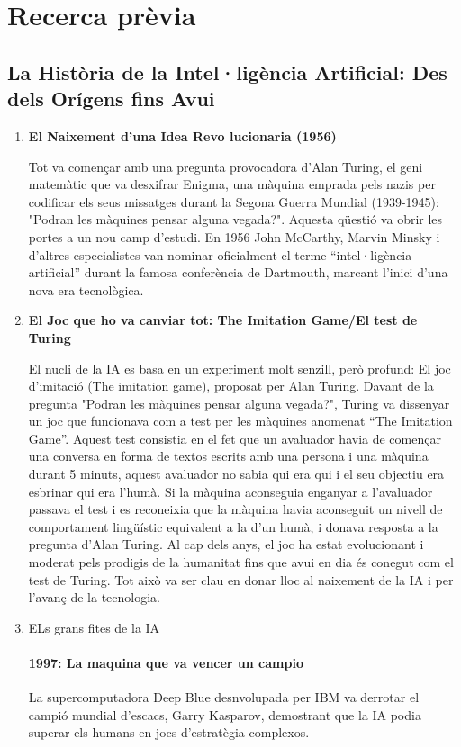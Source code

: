  \chapter{Recerca prèvia}
\label{c:recerca prèvia}
\section{La Història de la Intel·ligència Artificial: Des dels Orígens fins Avui}
\begin{enumerate}
     \item \textbf{El Naixement d'una Idea Revo lucionaria (1956)}

             Tot va començar amb una pregunta provocadora d’Alan Turing, el geni matemàtic que va desxifrar Enigma, una màquina emprada pels nazis per codificar els seus missatges durant la Segona Guerra Mundial (1939-1945): "Podran les màquines pensar alguna vegada?". Aquesta qüestió va obrir les portes a un nou camp d’estudi. En 1956 John McCarthy, Marvin Minsky i d'altres especialistes van nominar oficialment el terme ``intel·ligència artificial'' durant la famosa conferència de Dartmouth, marcant l'inici d'una nova era tecnològica.

      \item \textbf{El Joc que ho va canviar tot: The Imitation Game/El test de Turing}

            El nucli de la IA es basa en un experiment molt senzill, però profund: El joc d'imitació (The imitation game), proposat per Alan Turing. Davant de la pregunta "Podran les màquines pensar alguna vegada?", Turing va dissenyar un joc que funcionava com a test per les màquines anomenat ``The Imitation Game''. Aquest test consistia en el fet que un avaluador havia de començar una conversa en forma de textos escrits amb una persona i una màquina durant 5 minuts, aquest avaluador no sabia qui era qui i el seu objectiu era esbrinar qui era l'humà. Si la màquina aconseguia enganyar a l'avaluador passava el test i es reconeixia que la màquina havia aconseguit un nivell de comportament lingüístic equivalent a la d'un humà, i donava resposta a la pregunta d'Alan Turing. Al cap dels anys, el joc ha estat evolucionant i moderat pels prodigis de la humanitat fins que avui en dia és conegut com el test de Turing. Tot això va ser clau en donar lloc al naixement de la IA i per l'avanç de la tecnologia. \\

     \item ELs grans fites de la IA
        \subsubsection{1997: La maquina que va vencer un campio}
         La supercomputadora Deep Blue desnvolupada per IBM va derrotar el campió mundial d’escacs, Garry Kasparov, demostrant que la IA podia superar els humans en jocs d’estratègia complexos.

\end{enumerate}
